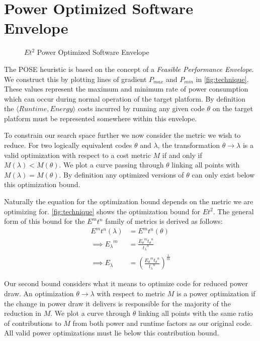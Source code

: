 \section{Power Optimized Software Envelope}
\label{sec:pose}

\begin{figure}
\centering

\caption{$Et^2$ Power Optimized Software Envelope}
\label{fig:technique}
\end{figure}

The POSE heuristic is based on the concept of a \emph{Feasible Performance Envelope}.
We construct this by plotting lines of gradient $P_{max}$ and $P_{min}$ in \autoref{fig:technique}.
These values represent the maximum and minimum rate of power consumption which can occur during normal operation of the target platform. By definition the $\langle Runtime, Energy\rangle$ costs incurred by running any given code $\theta$ on the target platform must be represented somewhere within this envelope.

To constrain our search space further we now consider the metric we wish to reduce.
For two logically equivalent codes $\theta$ and $\lambda$, the transformation ${\theta \to \lambda}$ is a valid optimization with respect to a cost metric $M$ if and only if ${M(\lambda) < M(\theta)}$.
We plot a curve passing through $\theta$ linking all points with ${M(\lambda) = M(\theta)}$.
By definition any optimized versions of $\theta$ can only exist below this optimization bound.

Naturally the equation for the optimization bound depends on the metric we are optimizing for.
\autoref{fig:technique} shows the optimization bound for $Et^2$.
The general form of this bound for the $E^mt^n$ family of metrics is derived as follows:
\begin{align}
E^mt^n(\lambda) &= E^mt^n(\theta) \nonumber \\
\implies {E_\lambda}^m &= \frac{{E_\theta}^m{t_\theta}^n}{{t_\lambda}^n} \nonumber \\
\implies E_\lambda &= (\frac{{E_\theta}^m{t_\theta}^n}{{t_\lambda}^n})^\frac{1}{m}
\label{eq:optimization}
\end{align}

Our second bound considers what it means to optimize code for reduced power draw. 
An optimization $\theta \to \lambda$ with respect to metric $M$ is a power optimization if the change in power draw it delivers is responsible for the majority of the reduction in $M$. We plot a curve through $\theta$ linking all points with the same ratio of contributions to $M$ from both power and runtime factors as our original code. All valid power optimizations must lie below this contribution bound. 

